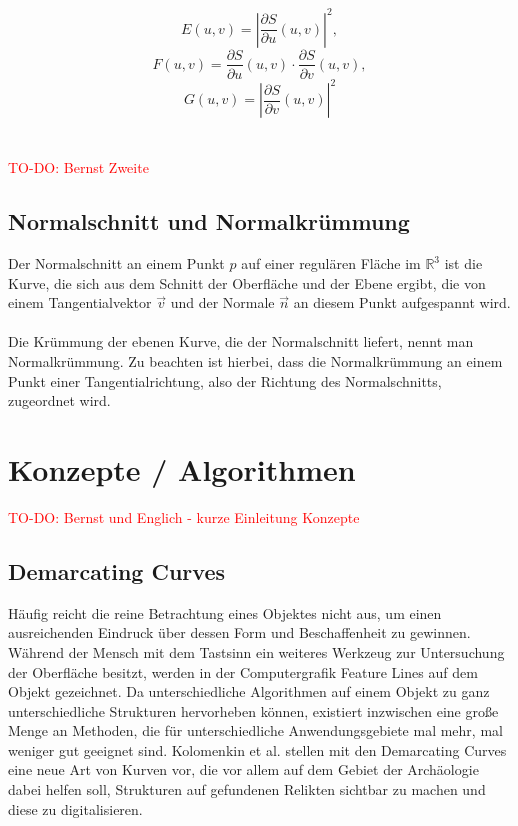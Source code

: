 \documentclass{paperStyle}
\newcommand\todo[1]{\textcolor{red}{#1}}
\begin{document}
\begin{equation}
E(u,v) = |\frac{\partial S}{\partial u}(u,v)|^{2},
\end{equation}	
\begin{equation}
F(u,v) = \frac{\partial S}{\partial u}(u,v) \cdot \frac{\partial S}{\partial v}(u,v),
\end{equation}	
\begin{equation}
G(u,v) = |\frac{\partial S}{\partial v}(u,v)|^{2}
\end{equation}	
\\
\\	
\todo{TO-DO: Bernst Zweite}
\subsection{Normalschnitt und Normalkrümmung}
\label{normalschnitt}
Der Normalschnitt an einem Punkt $p$ auf einer regulären Fläche im $\mathbb{R}^3$ ist die Kurve, die sich aus dem Schnitt der Oberfläche und der Ebene ergibt, die von einem Tangentialvektor $\vec{v}$ und der Normale $\vec{n}$ an diesem Punkt aufgespannt wird.\\\\Die Krümmung der ebenen Kurve, die der Normalschnitt liefert, nennt man Normalkrümmung. Zu beachten ist hierbei, dass die Normalkrümmung an einem Punkt einer Tangentialrichtung, also der Richtung des Normalschnitts, zugeordnet wird. 


\section{Konzepte / Algorithmen}
\todo{TO-DO: Bernst und Englich - kurze Einleitung Konzepte}

\subsection{Demarcating Curves}\label{demcurvlabel}
Häufig reicht die reine Betrachtung eines Objektes nicht aus, um einen ausreichenden Eindruck über dessen Form und Beschaffenheit zu gewinnen. Während der Mensch mit dem Tastsinn ein weiteres Werkzeug zur Untersuchung der Oberfläche besitzt, werden in der Computergrafik Feature Lines auf dem Objekt gezeichnet. Da unterschiedliche Algorithmen auf einem Objekt zu ganz unterschiedliche Strukturen hervorheben können, existiert inzwischen eine große Menge an Methoden, die für unterschiedliche Anwendungsgebiete mal mehr, mal weniger gut geeignet sind. Kolomenkin et al. \cite{Demarcating} stellen mit den Demarcating Curves eine neue Art von Kurven vor, die vor allem auf dem Gebiet der Archäologie dabei helfen soll, Strukturen auf gefundenen Relikten sichtbar zu machen und diese zu digitalisieren. 
\end{document}

